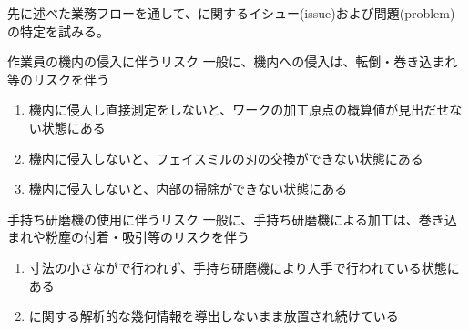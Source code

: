 

先に述べた業務フローを通して、\MMC に関するイシュー(issue)および問題(problem)の特定を試みる。




\begin{Issues}{作業員の機内の侵入に伴うリスク}
一般に、機内への侵入は、転倒・巻き込まれ等のリスクを伴う
\begin{enumerate}[label=\sarrow]
\item[{\sarrow[red]}]
機内に侵入し直接測定をしないと、ワークの加工原点の概算値が見出だせない状態にある
\item[{\sarrow[red]}] 機内に侵入しないと、フェイスミルの刃の交換ができない状態にある
\item 機内に侵入しないと、内部の掃除ができない状態にある
\end{enumerate}
\end{Issues}
\begin{Issues}{手持ち研磨機の使用に伴うリスク}
一般に、手持ち研磨機による加工は、巻き込まれや粉塵の付着・吸引等のリスクを伴う
\begin{enumerate}[label=\sarrow]
\item[{\sarrow[red]}]
寸法の小さな\EndFaceCChamferMilling が\MMC で行われず、手持ち研磨機により人手で行われている状態にある
\item[{\sarrow[red]}] \EndFaceChamferMilling に関する解析的な幾何情報を導出しないまま放置され続けている
\end{enumerate}
\end{Issues}
